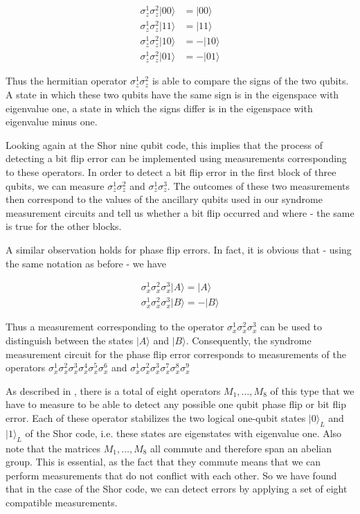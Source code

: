 \documentclass[a4paper, draft]{article}
\theoremstyle{own}
\theoremstyle{remark}
\begin{document}
\begin{align*}
\sigma_z^1 \sigma_z^2 |00 \rangle &= |00 \rangle \\
\sigma_z^1 \sigma_z^2 |11 \rangle &= |11 \rangle \\
\sigma_z^1 \sigma_z^2 |10 \rangle &= - |10 \rangle \\
\sigma_z^1 \sigma_z^2 |01 \rangle &= -|01 \rangle 
\end{align*}

Thus the hermitian operator $\sigma_z^1 \sigma_z^2$ is able to compare the signs of the two qubits. A state in which these two qubits have the same sign is in the eigenspace with eigenvalue one, a state in which the signs differ is in the eigenspace with eigenvalue minus one. 

Looking again at the Shor nine qubit code, this implies that the process of detecting a bit flip error can be implemented using measurements corresponding to these operators. In order to detect a bit flip error in the first block of three qubits, we can measure $\sigma_z^1 \sigma_z^2$ and $\sigma_z^1 \sigma_z^3$. The outcomes of these two measurements then correspond to the values of the ancillary qubits used in our syndrome measurement circuits and tell us whether a bit flip occurred and where - the same is true for the other blocks. 

A similar observation holds for phase flip errors. In fact, it is obvious that - using the same notation as before - we have

\begin{align*}
\sigma_x^1 \sigma_x^2 \sigma_x^3 |A \rangle = |A \rangle \\
\sigma_x^1 \sigma_x^2 \sigma_x^3 |B \rangle = -|B \rangle 
\end{align*}

Thus a measurement corresponding to the operator $\sigma_x^1 \sigma_x^2 \sigma_x^3$ can be used to distinguish between the states $|A \rangle $ and $|B \rangle$. Consequently, the syndrome measurement circuit for the phase flip error corresponds to measurements of the operators $\sigma_x^1\sigma_x^2 \sigma_x^3 \sigma_x^4 \sigma_x^5 \sigma_x^6$ and $\sigma_x^1\sigma_x^2 \sigma_x^3 \sigma_x^7 \sigma_x^8 \sigma_x^9$

As described in \cite{GThesis}, there is a total of eight operators $M_1, \dots, M_8$ of this type that we have to measure to be able to detect any possible one qubit phase flip or bit flip error. Each of these operator stabilizes the two logical one-qubit states $|0 \rangle_L$ and $|1\rangle_L$ of the Shor code, i.e. these states are eigenstates with eigenvalue one. Also note that the matrices $M_1, \dots, M_8$ all commute and therefore span an abelian group. This is essential, as the fact that they commute means that we can perform measurements that do not conflict with each other. So we have found that in the case of the Shor code, we can detect errors by applying a set of eight compatible measurements. 
\end{document}
